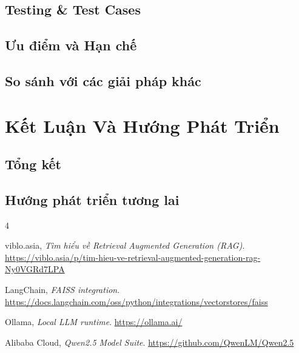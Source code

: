 \documentclass[conference]{IEEEtran}
\begin{document}
\subsection{Testing \& Test Cases}
\subsection{Ưu điểm và Hạn chế}
\subsection{So sánh với các giải pháp khác}

\section{Kết Luận Và Hướng Phát Triển}

\subsection{Tổng kết}
\subsection{Hướng phát triển tương lai}

\begin{thebibliography}{4}

viblo.asia,
\textit{Tìm hiểu về Retrieval Augmented Generation (RAG)}.
\url{https://viblo.asia/p/tim-hieu-ve-retrieval-augmented-generation-rag-Ny0VGRd7LPA}

LangChain,
\textit{FAISS integration}.
\url{https://docs.langchain.com/oss/python/integrations/vectorstores/faiss}

Ollama,
\textit{Local LLM runtime}.
\url{https://ollama.ai/}

Alibaba Cloud,
\textit{Qwen2.5 Model Suite}.
\url{https://github.com/QwenLM/Qwen2.5}

\end{thebibliography}
\end{document}
